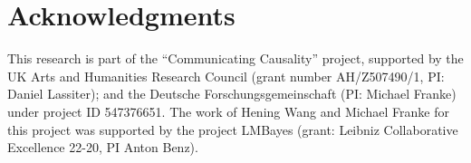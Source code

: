 \documentclass[10pt,letterpaper]{article}
\begin{document}
\section{Acknowledgments}

This research is part of the ``Communicating Causality'' project, supported by the UK Arts and Humanities Research Council (grant number AH/Z507490/1, PI: Daniel Lassiter); and the Deutsche Forschungsgemeinschaft (PI: Michael Franke) under project ID 547376651. 
The work of Hening Wang and Michael Franke for this project was supported by the project LMBayes (grant: Leibniz Collaborative Excellence 22-20, PI Anton Benz).


\printbibliography
\end{document}

